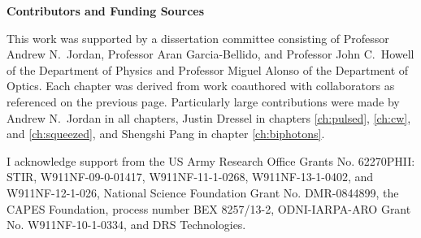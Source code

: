 \clearpage
\thispagestyle{plain}

\begin{center}
  \textbf{Contributors and Funding Sources}
\end{center}

This work was supported by a dissertation committee consisting of Professor Andrew N.~Jordan, Professor Aran Garcia-Bellido, and Professor John C.~Howell of the Department of Physics and Professor Miguel Alonso of the Department of Optics.  Each chapter was derived from work coauthored with collaborators as referenced on the previous page.  Particularly large contributions were made by Andrew N.~Jordan in all chapters, Justin Dressel in chapters \ref{ch:pulsed}, \ref{ch:cw}, and \ref{ch:squeezed}, and Shengshi Pang in chapter \ref{ch:biphotons}.

I acknowledge support from the US Army Research Office Grants No. 62270PHII: STIR, W911NF-09-0-01417, W911NF-11-1-0268, W911NF-13-1-0402, and W911NF-12-1-026,  National Science Foundation Grant No. DMR-0844899, the CAPES Foundation, process number BEX 8257/13-2, ODNI-IARPA-ARO Grant No. W911NF-10-1-0334, and DRS Technologies. 

